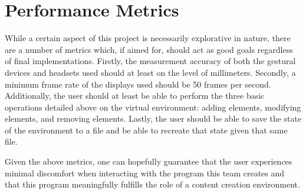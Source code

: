 \documentclass[letterpaper,10pt,titlepage]{article}
\begin{document}
\section{Performance Metrics}

While a certain aspect of this project is necessarily explorative in nature, there are a number of metrics which, if aimed for, should act as good goals regardless of final implementations. Firstly, the measurement accuracy of both the gestural devices and headsets used should at least on the level of millimeters. Secondly, a minimum frame rate of the displays used should be 50 frames per second. Additionally, the user should at least be able to perform the three basic operations detailed above on the virtual environment: adding elements, modifying elements, and removing elements.  Lastly, the user should be able to save the state of the environment to a file and be able to recreate that state given that same file.

Given the above metrics, one can hopefully guarantee that the user experiences minimal discomfort when interacting with the program this team creates and that this program meaningfully fulfills the role of a content creation environment.
\end{document}

